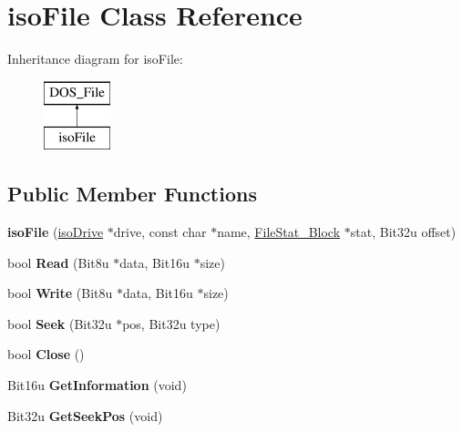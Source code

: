 \hypertarget{classisoFile}{\section{iso\-File Class Reference}
\label{classisoFile}
}
Inheritance diagram for iso\-File\-:\begin{figure}[H]
\begin{center}
\leavevmode
\includegraphics[height=2.000000cm]{classisoFile}
\end{center}
\end{figure}
\subsection*{Public Member Functions}
\begin{DoxyCompactItemize}
\item 
\hypertarget{classisoFile_a67bf2750ca70939ed41e6ecb53c5f355}{{\bfseries iso\-File} (\hyperlink{classisoDrive}{iso\-Drive} $\ast$drive, const char $\ast$name, \hyperlink{structFileStat__Block}{File\-Stat\-\_\-\-Block} $\ast$stat, Bit32u offset)}\label{classisoFile_a67bf2750ca70939ed41e6ecb53c5f355}

\item 
\hypertarget{classisoFile_ab0640960de5d525449c71bb2258622ee}{bool {\bfseries Read} (Bit8u $\ast$data, Bit16u $\ast$size)}\label{classisoFile_ab0640960de5d525449c71bb2258622ee}

\item 
\hypertarget{classisoFile_a53c35969a1743aa25b4b658e7842ba29}{bool {\bfseries Write} (Bit8u $\ast$data, Bit16u $\ast$size)}\label{classisoFile_a53c35969a1743aa25b4b658e7842ba29}

\item 
\hypertarget{classisoFile_a0540cf01d0e167584638b5ee5c116cd3}{bool {\bfseries Seek} (Bit32u $\ast$pos, Bit32u type)}\label{classisoFile_a0540cf01d0e167584638b5ee5c116cd3}

\item 
\hypertarget{classisoFile_a06749457b292297b7830776d113ad886}{bool {\bfseries Close} ()}\label{classisoFile_a06749457b292297b7830776d113ad886}

\item 
\hypertarget{classisoFile_a6e3255593ac75149fac3ab29ddc2a32d}{Bit16u {\bfseries Get\-Information} (void)}\label{classisoFile_a6e3255593ac75149fac3ab29ddc2a32d}

\item 
\hypertarget{classisoFile_a7b78a353cbde35194b15f869d547a763}{Bit32u {\bfseries Get\-Seek\-Pos} (void)}\label{classisoFile_a7b78a353cbde35194b15f869d547a763}

\end{DoxyCompactItemize}


